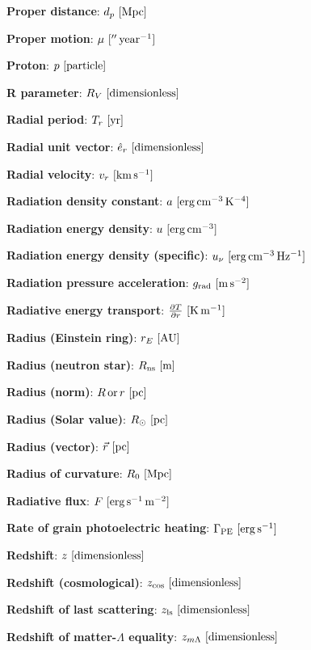 \documentclass[a4paper,10pt]{article}
\begin{document}
{\noindent}\textbf{Proper distance}: $d_p ~ [{\rm Mpc}]$

{\noindent}\textbf{Proper motion}: $\mu ~ [{\rm ''\,year^{-1}}]$

{\noindent}\textbf{Proton}: $p ~ [{\rm particle}]$

{\noindent}\textbf{R parameter}: $R_V ~ [{\rm dimensionless}]$

{\noindent}\textbf{Radial period}: $T_r ~ [{\rm yr}]$

{\noindent}\textbf{Radial unit vector}: $\hat{e}_r ~ [{\rm dimensionless}]$

{\noindent}\textbf{Radial velocity}: $v_r ~ [{\rm km\,s^{-1}}]$

{\noindent}\textbf{Radiation density constant}: $a ~ [{\rm erg\,cm^{-3}\,K^{-4}}]$

{\noindent}\textbf{Radiation energy density}: $u ~ [{\rm erg\,cm^{-3}}]$

{\noindent}\textbf{Radiation energy density (specific)}: $u_\nu ~
[{\rm erg\,cm^{-3}\,Hz^{-1}}]$

{\noindent}\textbf{Radiation pressure acceleration}: $g_{\rm rad} ~ [{\rm m\,s^{-2}}]$

{\noindent}\textbf{Radiative energy transport}: $\frac{\partial T}{\partial r} ~ [{\rm K\,m^{-1}}]$

{\noindent}\textbf{Radius (Einstein ring)}: $r_E ~ [{\rm AU}]$

{\noindent}\textbf{Radius (neutron star)}: $R_{\rm ns} ~ [{\rm m}]$

{\noindent}\textbf{Radius (norm)}: $R\,{\rm or}\,r ~ [{\rm pc}]$

{\noindent}\textbf{Radius (Solar value)}: $R_\odot ~ [{\rm pc}]$

{\noindent}\textbf{Radius (vector)}: $\vec{r} ~ [{\rm pc}]$

{\noindent}\textbf{Radius of curvature}: $R_0 ~ [{\rm Mpc}]$

{\noindent}\textbf{Radiative flux}: $F ~ [{\rm erg\,s^{-1}\,m^{-2}}]$

{\noindent}\textbf{Rate of grain photoelectric heating}: $\Gamma_{\rm PE} ~ [{\rm erg\,s^{-1}}]$

{\noindent}\textbf{Redshift}: $z ~ [{\rm dimensionless}]$

{\noindent}\textbf{Redshift (cosmological)}: $z_\mathrm{cos} ~ [{\rm dimensionless}]$

{\noindent}\textbf{Redshift of last scattering}: $z_\mathrm{ls} ~ [{\rm dimensionless}]$

{\noindent}\textbf{Redshift of matter-$\Lambda$ equality}: $z_{m\Lambda} ~ [{\rm dimensionless}]$
\end{document}
